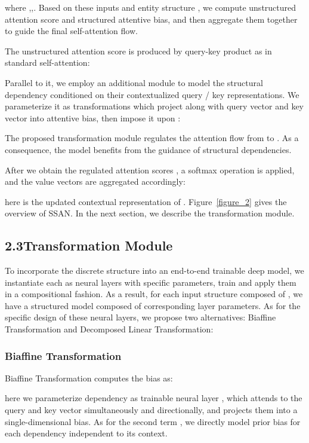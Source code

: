 \documentclass[letterpaper]{article} \usepackage{aaai21}  \usepackage{times}  \usepackage{helvet} \usepackage{courier}  \usepackage[hyphens]{url}  \usepackage{graphicx} \usepackage{booktabs}
\begin{document}
where ,,.
Based on these inputs and entity structure , we compute unstructured attention score and structured attentive bias, and then aggregate them together to guide the final self-attention flow.

The unstructured attention score is produced by query-key product as in standard self-attention:

Parallel to it, we employ an additional module to model the structural dependency conditioned on their contextualized query / key representations.
We parameterize it as transformations which project  along with query vector  and key vector  into attentive bias, then impose it upon :

The proposed transformation module regulates the attention flow from  to .
As a consequence, the model benefits from the guidance of structural dependencies.

After we obtain the regulated attention scores , a softmax operation is applied, and the value vectors are aggregated accordingly:

here  is the updated contextual representation of .
Figure~\ref{figure_2} gives the overview of SSAN.
In the next section, we describe the transformation module.



\subsection{2.3\quad Transformation Module}\label{2.3:Transformation Module}
To incorporate the discrete structure  into an end-to-end trainable deep model, we instantiate each  as neural layers with specific parameters, train and apply them in a compositional fashion.
As a result, for each input structure  composed of , we have a structured model composed of corresponding layer parameters.
As for the specific design of these neural layers, we propose two alternatives: Biaffine Transformation and Decomposed Linear Transformation:



\subsubsection{Biaffine Transformation}
Biaffine Transformation computes the bias as:

here we parameterize dependency  as trainable neural layer , which attends to the query and key vector simultaneously and directionally, and projects them into a single-dimensional bias.
As for the second term , we directly model prior bias for each dependency independent to its context.
\end{document}
